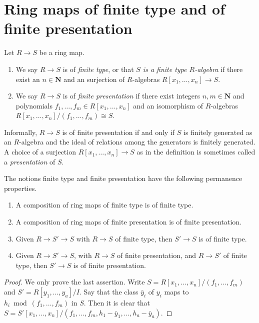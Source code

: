 \section{Ring maps of finite type and of finite presentation}
\label{section-finite-type}

\begin{definition}
\label{definition-finite-type}
Let $R \to S$ be a ring map.
\begin{enumerate}
\item We say $R \to S$ is of {\it finite type}, or that {\it $S$ is a finite
type $R$-algebra} if there exist an $n \in \mathbf{N}$ and an surjection
of $R$-algebras $R[x_1, \ldots, x_n] \to S$.
\item We say $R \to S$ is of {\it finite presentation} if there
exist integers $n, m \in \mathbf{N}$ and polynomials
$f_1, \ldots, f_m \in R[x_1, \ldots, x_n]$
and an isomorphism of $R$-algebras
$R[x_1, \ldots, x_n]/(f_1, \ldots, f_m) \cong S$.
\end{enumerate}
\end{definition}

\noindent
Informally, $R \to S$ is of finite presentation if and only if
$S$ is finitely generated as an $R$-algebra
and the ideal of relations among the generators is finitely generated.
A choice of a surjection $R[x_1, \ldots, x_n] \to S$ as in the definition
is sometimes called a {\it presentation} of $S$.

\begin{lemma}
\label{lemma-compose-finite-type}
The notions finite type and finite presentation have the following
permanence properties.
\begin{enumerate}
\item A composition of ring maps of finite type is of finite type.
\item A composition of ring maps of finite presentation is of finite
presentation.
\item Given $R \to S' \to S$ with $R \to S$ of finite type,
then $S' \to S$ is of finite type.
\item Given $R \to S' \to S$, with $R \to S$ of finite presentation,
and $R \to S'$ of finite type, then $S' \to S$ is of finite presentation.
\end{enumerate}
\end{lemma}

\begin{proof}
We only prove the last assertion.
Write $S = R[x_1, \ldots, x_n]/(f_1, \ldots, f_m)$
and $S' = R[y_1, \ldots, y_a]/I$. Say that the class
$\bar y_i$ of $y_i$ maps
to $h_i \bmod (f_1, \ldots, f_m)$ in $S$.
Then it is clear that
$S = S'[x_1, \ldots, x_n]/(f_1, \ldots, f_m,
h_1 - \bar y_1, \ldots, h_a - \bar y_a)$.
\end{proof}

